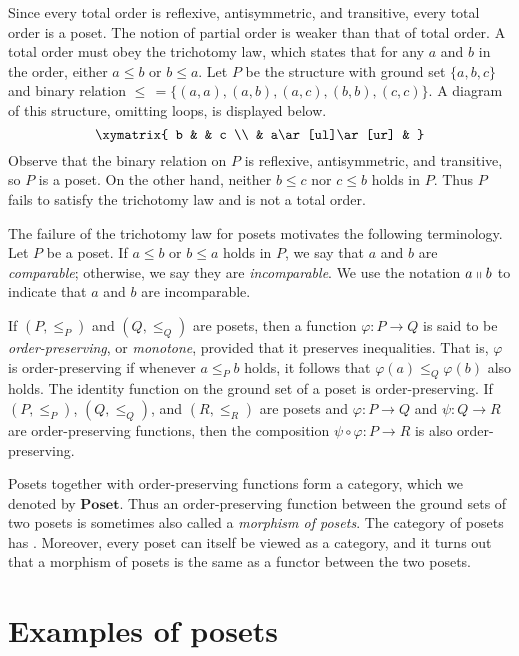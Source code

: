 \documentclass[12pt]{article}
\theoremstyle{definition}
\begin{document}
Since every total order is reflexive, antisymmetric, and transitive,
every total order is a poset.  The notion of partial order is weaker
than that of total order.  A total order must obey the trichotomy law,
which states that for any $a$ and $b$ in the order, either $a\le b$ or
$b\le a$.  Let $P$ be the structure with ground set $\{a,b,c\}$ and
binary relation $\le\, = \{(a,a),(a,b),(a,c),(b,b),(c,c)\}$.  A
diagram of this structure, omitting loops, is displayed below.
\[\xymatrix{
b &                 & c \\
  & a\ar[ul]\ar[ur] &
}\]
Observe that the binary relation on $P$ is reflexive, antisymmetric,
and transitive, so $P$ is a poset.  On the other hand, neither $b\le
c$ nor $c\le b$ holds in $P$.  Thus $P$ fails to satisfy the
trichotomy law and is not a total order.

The failure of the trichotomy law for posets motivates the following
terminology.  Let $P$ be a poset.  If $a\le b$ or $b\le a$ holds in
$P$, we say that $a$ and $b$ are \emph{comparable}; otherwise, we say
they are \emph{incomparable}.  We use the notation $a\shortparallel b$
to indicate that $a$ and $b$ are incomparable.

If $(P,\le_P)$ and $(Q,\le_Q)$ are posets, then a function
$\varphi\colon P\to Q$ is said to be \emph{order-preserving}, or
\emph{monotone}, provided that it preserves inequalities.  That is,
$\varphi$ is order-preserving if whenever $a\le_P b$ holds, it follows
that $\varphi(a)\le_Q\varphi(b)$ also holds.  The identity function on
the ground set of a poset is order-preserving.  If $(P,\le_P)$,
$(Q,\le_Q)$, and $(R,\le_R)$ are posets and $\varphi\colon P\to Q$ and
$\psi\colon Q\to R$ are order-preserving functions, then the
composition $\psi\circ\varphi\colon P\to R$ is also order-preserving.

Posets together with order-preserving functions form a category, which
we denoted by $\mathbf{Poset}$.  Thus an order-preserving function
between the ground sets of two posets is sometimes also called a
\emph{morphism of posets}.  The category of posets has
.  Moreover, every
poset can itself be viewed as a category, and it turns out that a
morphism of posets is the same as a functor between the two posets.

\section*{Examples of posets}
\end{document}
